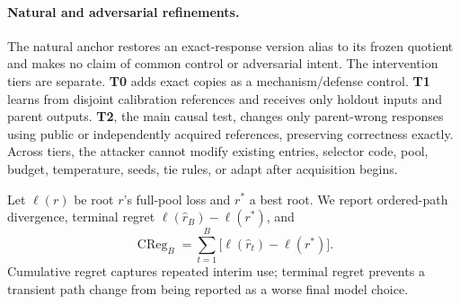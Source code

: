 \paragraph{Natural and adversarial refinements.}
The natural anchor restores an exact-response version alias to its frozen quotient and makes no claim of common control or adversarial intent. The intervention tiers are separate. \textbf{T0} adds exact copies as a mechanism/defense control. \textbf{T1} learns from disjoint calibration references and receives only holdout inputs and parent outputs. \textbf{T2}, the main causal test, changes only parent-wrong responses using public or independently acquired references, preserving correctness exactly. Across tiers, the attacker cannot modify existing entries, selector code, pool, budget, temperature, seeds, tie rules, or adapt after acquisition begins.

Let $\ell(r)$ be root $r$'s full-pool loss and $r^*$ a best root. We report ordered-path divergence, terminal regret $\ell(\widehat r_B)-\ell(r^*)$, and
\[
\operatorname{CReg}_B=\sum_{t=1}^{B}\bigl[\ell(\widehat r_t)-\ell(r^*)\bigr].
\]
Cumulative regret captures repeated interim use; terminal regret prevents a transient path change from being reported as a worse final model choice.
